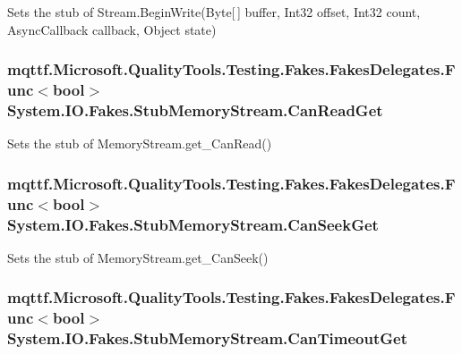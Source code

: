 Sets the stub of Stream.\-Begin\-Write(\-Byte\mbox{[}$\,$\mbox{]} buffer, Int32 offset, Int32 count, Async\-Callback callback, Object state)

\hypertarget{class_system_1_1_i_o_1_1_fakes_1_1_stub_memory_stream_a4b8373fa0755b49764eaa3c58facd272}{
\subsubsection[{Can\-Read\-Get}]{\setlength{\rightskip}{0pt plus 5cm}mqttf.\-Microsoft.\-Quality\-Tools.\-Testing.\-Fakes.\-Fakes\-Delegates.\-Func$<$bool$>$ System.\-I\-O.\-Fakes.\-Stub\-Memory\-Stream.\-Can\-Read\-Get}}\label{class_system_1_1_i_o_1_1_fakes_1_1_stub_memory_stream_a4b8373fa0755b49764eaa3c58facd272}


Sets the stub of Memory\-Stream.\-get\-\_\-\-Can\-Read()

\hypertarget{class_system_1_1_i_o_1_1_fakes_1_1_stub_memory_stream_ab0467525e30d9dd45eee1bdb05d05a25}{
\subsubsection[{Can\-Seek\-Get}]{\setlength{\rightskip}{0pt plus 5cm}mqttf.\-Microsoft.\-Quality\-Tools.\-Testing.\-Fakes.\-Fakes\-Delegates.\-Func$<$bool$>$ System.\-I\-O.\-Fakes.\-Stub\-Memory\-Stream.\-Can\-Seek\-Get}}\label{class_system_1_1_i_o_1_1_fakes_1_1_stub_memory_stream_ab0467525e30d9dd45eee1bdb05d05a25}


Sets the stub of Memory\-Stream.\-get\-\_\-\-Can\-Seek()

\hypertarget{class_system_1_1_i_o_1_1_fakes_1_1_stub_memory_stream_a6497bbe2bd413d4cad1aed0151e2fe73}{
\subsubsection[{Can\-Timeout\-Get}]{\setlength{\rightskip}{0pt plus 5cm}mqttf.\-Microsoft.\-Quality\-Tools.\-Testing.\-Fakes.\-Fakes\-Delegates.\-Func$<$bool$>$ System.\-I\-O.\-Fakes.\-Stub\-Memory\-Stream.\-Can\-Timeout\-Get}}\label{class_system_1_1_i_o_1_1_fakes_1_1_stub_memory_stream_a6497bbe2bd413d4cad1aed0151e2fe73}


